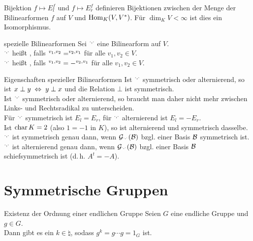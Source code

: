 \begin{Satz}{Bijektion}
    $f \mapsto E_l^f$ und $f \mapsto E_r^f$ definieren Bijektionen zwischen
    der Menge der Bilinearformen $f$ auf $V$ und $\operatorname{Hom}_K(V, V^\ast)$.
    Für $\dim_K V < \infty$ ist dies ein Isomorphismus.
\end{Satz}

\begin{Def}{spezielle Bilinearformen}
    Sei $\sp{\cdot, \cdot}$ eine Bilinearform auf $V$. \\
    $\sp{\cdot, \cdot}$ heißt , falls
    $\sp{v_1, v_2} = \sp{v_2, v_1}$ für alle $v_1, v_2 \in V$. \\
    $\sp{\cdot, \cdot}$ heißt , falls
    $\sp{v_1, v_2} = -\sp{v_2, v_1}$ für alle $v_1, v_2 \in V$.
\end{Def}

\begin{Lemma}{Eigenschaften spezieller Bilinearformen}
    Ist $\sp{\cdot, \cdot}$ symmetrisch oder alternierend, so ist
    $x \;\bot\; y \;\Leftrightarrow\; y \;\bot\; x$ und die Relation $\bot$ ist
    symmetrisch. \\
    Ist $\sp{\cdot, \cdot}$ symmetrisch oder alternierend, so braucht man
    daher nicht mehr zwischen Links- und Rechtsradikal zu unterscheiden. \\
    Für $\sp{\cdot, \cdot}$ symmetrisch ist $E_l = E_r$,
    für $\sp{\cdot, \cdot}$ alternierend ist $E_l = -E_r$. \\
    Ist $\operatorname{char} K = 2$ (also $1 = -1$ in $K$), so ist alternierend und
    symmetrisch dasselbe. \\
    $\sp{\cdot, \cdot}$ ist symmetrisch genau dann, wenn
    $\mathcal{G}_{\sp{\cdot, \cdot}}(\mathcal{B})$ bzgl. einer Basis $\mathcal{B}$
    symmetrisch ist. \\
    $\sp{\cdot, \cdot}$ ist alternierend genau dann, wenn
    $\mathcal{G}_{\sp{\cdot, \cdot}}(\mathcal{B})$ bzgl. einer Basis $\mathcal{B}$
    schiefsymmetrisch ist (d.\,h. $A^t = -A$).
\end{Lemma}

\addtocounter{subsection}{1}

\section{%
    Symmetrische Gruppen%
}

\begin{Satz}{Existenz der Ordnung einer endlichen Gruppe}
    Seien $G$ eine endliche Gruppe und $g \in G$. \\
    Dann gibt es ein $k \in \natural$, sodass $g^k = g \dotsm g = 1_G$ ist.
\end{Satz}

